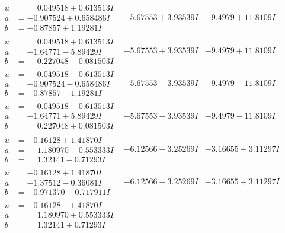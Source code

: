 \documentclass[1p]{elsarticle_modified}
\theoremstyle{definition}
\begin{document}
$$\begin{array}{c|c|c}
 \hline 
\begin{aligned}
u &= \phantom{-}0.049518 + 0.613513 I \\
a &= -0.907524 + 0.658486 I \\
b &= -0.87857 + 1.19281 I\end{aligned}
 & -5.67553 + 3.93539 I & -9.4979 + 11.8109 I \\ \hline\begin{aligned}
u &= \phantom{-}0.049518 + 0.613513 I \\
a &= -1.64771 - 5.89429 I \\
b &= \phantom{-}0.227048 - 0.081503 I\end{aligned}
 & -5.67553 + 3.93539 I & -9.4979 + 11.8109 I \\ \hline\begin{aligned}
u &= \phantom{-}0.049518 - 0.613513 I \\
a &= -0.907524 - 0.658486 I \\
b &= -0.87857 - 1.19281 I\end{aligned}
 & -5.67553 - 3.93539 I & -9.4979 - 11.8109 I \\ \hline\begin{aligned}
u &= \phantom{-}0.049518 - 0.613513 I \\
a &= -1.64771 + 5.89429 I \\
b &= \phantom{-}0.227048 + 0.081503 I\end{aligned}
 & -5.67553 - 3.93539 I & -9.4979 - 11.8109 I \\ \hline\begin{aligned}
u &= -0.16128 + 1.41870 I \\
a &= \phantom{-}1.180970 - 0.553333 I \\
b &= \phantom{-}1.32141 - 0.71293 I\end{aligned}
 & -6.12566 - 3.25269 I & -3.16655 + 3.11297 I \\ \hline\begin{aligned}
u &= -0.16128 + 1.41870 I \\
a &= -1.37512 - 0.36081 I \\
b &= -0.971370 - 0.717911 I\end{aligned}
 & -6.12566 - 3.25269 I & -3.16655 + 3.11297 I \\ \hline\begin{aligned}
u &= -0.16128 - 1.41870 I \\
a &= \phantom{-}1.180970 + 0.553333 I \\
b &= \phantom{-}1.32141 + 0.71293 I\end{aligned}

\end{array}$$
\end{document}
